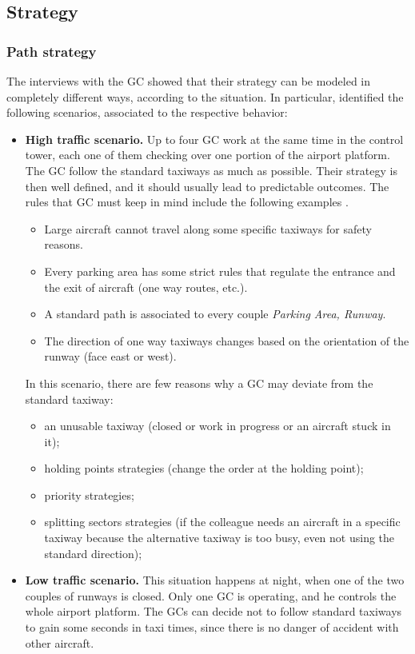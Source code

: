 \documentclass{article}
\begin{document}
\subsection{Strategy}
\subsubsection{Path strategy}
The interviews with the GC showed that their strategy can be modeled in completely different ways, according to the situation. In particular, identified the following scenarios, associated to the respective behavior:

\begin{itemize}
	\item \textbf{High traffic scenario.} Up to four GC work at the same time in the control tower, each one of them checking over one portion of the airport platform. The GC follow the standard taxiways as much as possible. Their strategy is then well defined, and it should usually lead to predictable outcomes. 
	The rules that GC must keep in mind include the following examples \cite{livret}.
	\begin{itemize}
		\item Large aircraft cannot travel along some specific taxiways for safety reasons.
		\item Every parking area has some strict rules that regulate the entrance and the exit of aircraft (one way routes, etc.).
		\item A standard path is associated to every couple \textit{Parking Area, Runway}.
		\item The direction of one way taxiways changes based on the orientation of the runway (face east or west).
	\end{itemize}
	In this scenario, there are few reasons why a GC may deviate from the standard taxiway:
	\begin{itemize}
		\item an unusable taxiway (closed or work in progress or an aircraft stuck in it);
		\item holding points strategies (change the order at the holding point);
		\item priority strategies;
		\item splitting sectors strategies (if the colleague needs an aircraft in a specific taxiway because the alternative taxiway is too busy, even not using the standard direction);
	\end{itemize}
	\item \textbf{Low traffic scenario.} This situation happens at night, when one of the two couples of runways is closed. Only one GC is operating, and he controls the whole airport platform. The GCs can decide not to follow standard taxiways to gain some seconds in taxi times, since there is no danger of accident with other aircraft.
	

\end{itemize}
\end{document}
